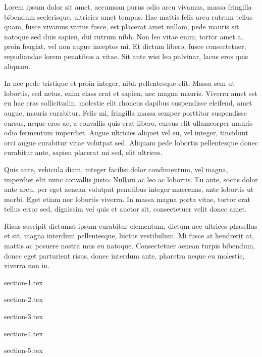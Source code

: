 \documentclass{TMR}
\begin{document}
\begin{coverletter}

    Lorem ipsum dolor sit amet, accumsan purus odio arcu vivamus, massa fringilla bibendum scelerisque, ultricies amet tempus. Hac mattis felis arcu rutrum tellus quam, fusce vivamus varius fusce, est placerat amet nullam, pede mauris sit natoque sed duis sapien, dui rutrum nibh. Non leo vitae enim, tortor amet a, proin feugiat, vel non augue inceptos mi. Et dictum libero, fusce consectetuer, repudiandae lorem penatibus a vitae. Sit ante wisi leo pulvinar, lacus eros quis aliquam.

    In nec pede tristique et proin integer, nibh pellentesque elit. Massa sem ut lobortis, sed netus, enim class erat et sapien, nec magna mauris. Viverra amet est eu hac cras sollicitudin, molestie elit rhoncus dapibus suspendisse eleifend, amet augue, mauris curabitur. Felis mi, fringilla massa semper porttitor suspendisse cursus, neque eros ac, a convallis quis erat libero, cursus elit ullamcorper mauris odio fermentum imperdiet. Augue ultricies aliquet vel eu, vel integer, tincidunt orci augue curabitur vitae volutpat sed. Aliquam pede lobortis pellentesque donec curabitur ante, sapien placerat mi sed, elit ultrices.

    Quis ante, vehicula diam, integer facilisi dolor condimentum, vel magna, imperdiet elit nunc convallis justo. Nullam ac leo ac lobortis. Eu ante, sociis dolor ante arcu, per eget aenean volutpat penatibus integer maecenas, ante lobortis ut morbi. Eget etiam nec lobortis viverra. In massa magna porta vitae, tortor erat tellus error sed, dignissim vel quis et auctor sit, consectetuer velit donec amet.

    Risus suscipit dictumst ipsum curabitur elementum, dictum nec ultrices phasellus et sit, magna interdum pellentesque, luctus vestibulum. Mi fusce at hendrerit at, mattis ac posuere nostra mus eu natoque. Consectetuer aenean turpis bibendum, donec eget parturient risus, donec interdum ante, pharetra neque eu molestie, viverra non in.

\end{coverletter}


\begin{resume}

    {section-1.tex}

    {section-2.tex}

    {section-3.tex}

    {section-4.tex}

    {section-5.tex}

\end{resume}
\end{document}
